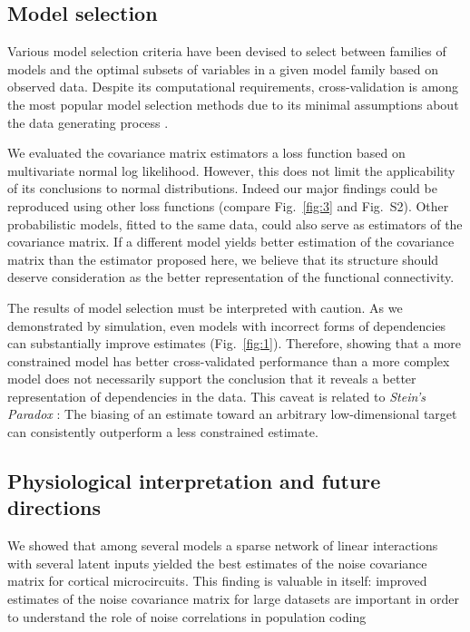\subsection*{Model selection}
Various model selection criteria have been devised to select between families of models and the optimal subsets of variables in a given model family based on observed data. Despite its computational requirements, cross-validation is among the most popular model selection methods due to its minimal assumptions about the data generating process \citep{Arlot:2010}.

We evaluated the covariance matrix estimators a loss function based on multivariate normal log likelihood.  However, this does not limit the applicability of its conclusions to normal distributions. Indeed our major findings could be reproduced using other loss functions (compare Fig.~\ref{fig:3} and Fig.~S2).  Other probabilistic models, fitted to the same data, could also serve as estimators of the covariance matrix.  If a different model yields better estimation of the covariance matrix than the estimator proposed here, we believe that its structure should deserve consideration as the better representation of the functional connectivity.

The results of model selection must be interpreted with caution.  As we demonstrated by simulation, even models with incorrect forms of dependencies can substantially improve estimates (Fig.~\ref{fig:1}). Therefore, showing that a more constrained model has better cross-validated performance than a more complex model does not necessarily support the conclusion that it reveals a better representation of dependencies in the data.  This caveat is related to \emph{Stein's Paradox} \citep{Efron:1977}: The biasing of an estimate toward an arbitrary low-dimensional target can consistently outperform a less constrained estimate.

\subsection*{Physiological interpretation and future directions}

We showed that among several models a sparse network of linear interactions with several latent inputs yielded the best estimates of the noise covariance matrix for cortical microcircuits.  This finding is valuable in itself: improved estimates of the noise covariance matrix for large datasets are important in order to understand the role of noise correlations in population coding \citep{Abbott:1999, Sompolinsky:2001, Averbeck:2006, Ecker:2011}

